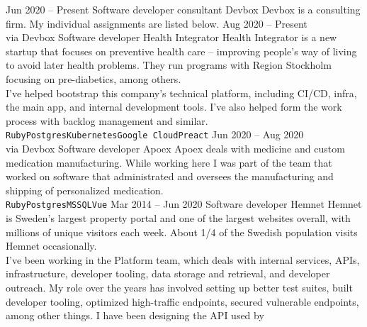 \documentclass[9pt]{template} %
\begin{document}

\pagebreak
{}

\begin{entrylist}
  \entry
    {Jun 2020 -- Present}
    {Software developer consultant}
    {Devbox}
    {Devbox is a consulting firm. My individual assignments are listed below.}
  \entry
    {Aug 2020 -- Present\\\footnotesize{via Devbox}}
    {Software developer}
    {Health Integrator}
    {Health Integrator is a new startup that focuses on preventive health care
    -- improving people's way of living to avoid later health problems. They
    run programs with Region Stockholm focusing on pre-diabetics, among
    others.\\ I've helped bootstrap this company's technical platform,
    including CI/CD, infra, the main app, and internal development tools. I've
    also helped form the work process with backlog management and similar.\\
      \texttt{Ruby}\slashsep\texttt{Postgres}\slashsep\texttt{Kubernetes}\slashsep\texttt{Google
      Cloud}\slashsep\texttt{Preact}}
  \entry
    {Jun 2020 -- Aug 2020\\\footnotesize{via Devbox}}
    {Software developer}
    {Apoex}
    {Apoex deals with medicine and custom medication manufacturing. While
      working here I was part of the team that worked on software that
      administrated and oversees the manufacturing and shipping of personalized
      medication.\\
      \texttt{Ruby}\slashsep\texttt{Postgres}\slashsep\texttt{MSSQL}\slashsep\texttt{Vue}}
  \entry
    {Mar 2014 -- Jun 2020}
    {Software developer}
    {Hemnet}
    {Hemnet is Sweden's largest property portal and one of the largest websites
      overall, with millions of unique visitors each week. About 1/4 of the
      Swedish population visits Hemnet occasionally.\\ I've been working in the
      Platform team, which deals with internal services, APIs, infrastructure,
      developer tooling, data storage and retrieval, and developer outreach. My
      role over the years has involved setting up better test suites, built
      developer tooling, optimized high-traffic endpoints, secured vulnerable
      endpoints, among other things. I have been designing the API used by
}
\end{entrylist}
\end{document}
